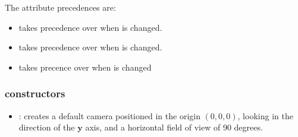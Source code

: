 The attribute precedences are:

\begin{itemize}
  \item {} takes precedence over  when  is changed.
	\item {} takes precedence over  when  is changed.
	\item {} takes precence over  when  is changed
\end{itemize}

\subsubsection*{constructors}
\begin{itemize}
	\item {}:
		creates a default camera positioned in the origin $\left(0,0,0\right)$, looking in the direction of the $\mathbf{y}$ axis, and a horizontal field of view of 90 degrees.
\end{itemize}

